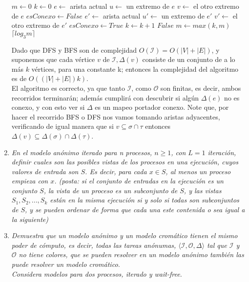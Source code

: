 \documentclass{article}
\begin{document}
\begin{enumerate}
{    \begin{algorithmic}
    \STATE $m \leftarrow 0$
    \STATE $k \leftarrow 0$
    \STATE $e \leftarrow $ arista actual
    \STATE $u \leftarrow $ un extremo de $e$
    \STATE $v \leftarrow $ el otro extremo de $e$
    \STATE $esConexo \leftarrow False$
    \STATE $e' \leftarrow $ arista actual
    \STATE $u' \leftarrow $ un extremo de $e'$
    \STATE $v' \leftarrow $ el otro extremo de $e'$
    \STATE $esConexo \leftarrow True$
    \ENDIF
    \STATE $k \leftarrow k + 1$
    \ENDIF
    \ENDFOR
    \RETURN $False$
    \ENDIF
    \STATE $m \leftarrow max(k, m)$
    \ENDFOR
    \RETURN $\lceil log_{3} m \rceil$
    \end{algorithmic}

    Dado que DFS y BFS son de complejidad $O(\mathcal{I}) = O(|V| + |E|)$, y suponemos que cada vértice $v$ de $\mathcal{I},\Delta(v)$
    consiste de un conjunto de a lo más $k$ vértices, para una constante k; entonces la complejidad del algoritmo es de
    $O((|V| + |E|) k)$.\\
    El algoritmo es correcto, ya que tanto $\mathcal{I}$, como $\mathcal{O}$ son finitas, es decir, ambos recorridos terminarán; además
    cumplirá con descubrir si algún $\Delta(e)$ no es conexo, y con esto ver si $\Delta$ es un mapeo portador conexo. Note que, por
    hacer el recorrido BFS o DFS nos vamos tomando aristas adyacentes, verificando de igual manera que si $v\subseteq\sigma\cap\tau$ entonces
    $\Delta(v)\subseteq\Delta(\sigma)\cap\Delta(\tau)$.
  }

\item {
    \textsl{
      En el modelo anónimo iterado para n procesos, $n ≥ 1$, con $L = 1$ iteración, definir
      cuales son las posibles vistas de los procesos en una ejecución, cuyos valores de entrada
      son $S$. Es decir, para cada $x \in S$, al menos un proceso empieza con $x$. (posta: si el
      conjunto de entradas en la ejecución es un conjunto $S$, la vista de un proceso es un 
      subconjunto de $S$, y las vistas $S_1,S_2,...,S_k$ están en la misma ejecución si y solo si
      todas son subconjuntos de $S$, y se pueden ordenar de forma que cada una este contenida o
      sea igual a la siguiente)
    }
  }
  
\item{
    \textsl{
      Demuestra que un modelo anónimo y un modelo cromático tienen el mismo poder de cómputo, es
      decir, todas las tareas anónumas, $\langle \mathcal{I},\mathcal{O},\Delta \rangle$ tal que
      $\mathcal{I}$ y $\mathcal{O}$ no tiene colores, que se pueden resolver en un modelo anónimo
      también las puede resolver un modelo cromático.\\
      Considera modelos para dos procesos, iterado y wait-free.
    }
  }
\end{enumerate}
\end{document}
